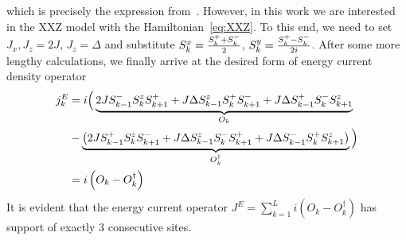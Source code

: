which is precisely the expression from~\textcite{Zotos1997}. 
However, in this work we are interested in the XXZ model with the Hamiltonian~\eqref{eq:XXZ}. To this end,
we need to set \(J_x, J_z = 2J\), \(J_z = \Delta \) and substitute \(S^{x}_k = \frac{S^{+}_k + S^{-}_k}{2}\), \(S^{y}_k = \frac{S^{+}_k-S^{-}_k}{2i}\).
After some more lengthy calculations, we finally arrive at the desired form of energy current density operator
\begin{align}
    j_k^E &= i \Big( \underbrace{2J S^{-}_{k-1}S^{z}_k S^{+}_{k+1} + J \Delta S^{z}_{k-1}S^{+}_k S^{-}_{k+1} + J\Delta S^{+}_{k-1}S^{-}_kS^{z}_{k+1}}_{O_k} \nonumber \\
    &- \underbrace{\left(2J S^{+}_{k-1}S^{z}_k S^{-}_{k+1} + J\Delta S^{z}_{k-1}S^{-}_k S^{+}_{k+1} + J\Delta S^{-}_{k-1}S^{+}_{k} S^{z}_{k+1} \right)}_{O_k^{\dagger}}\Big) \nonumber \\
    &= i\left(O_k - O_k^{\dagger}\right)
    \label{eq:final energy current density}
\end{align}
It is evident that the energy current operator \(J^E = \sum_{k=1}^L i \left(O_k - O_k^{\dagger}\right) \) has support of exactly \(3\) consecutive sites.

